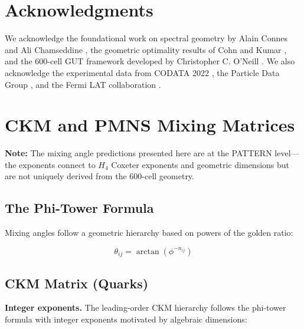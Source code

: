 \documentclass[12pt,a4paper]{article}
\begin{document}
\section*{Acknowledgments}

We acknowledge the foundational work on spectral geometry by Alain Connes and Ali Chamseddine \cite{chamseddine1997}, the geometric optimality results of Cohn and Kumar \cite{cohn2007,cohn2011}, and the 600-cell GUT framework developed by Christopher C. O'Neill \cite{oneill2025gut,oneill2025120cell,oneill2023binary}. We also acknowledge the experimental data from CODATA 2022 \cite{codata2022}, the Particle Data Group \cite{pdg2024}, and the Fermi LAT collaboration \cite{fermi2009}.

\appendix

\section{CKM and PMNS Mixing Matrices}
\label{app:ckm}

\textbf{Note:} The mixing angle predictions presented here are at the PATTERN level---the exponents connect to $H_4$ Coxeter exponents and geometric dimensions but are not uniquely derived from the 600-cell geometry.


\subsection{The Phi-Tower Formula}

Mixing angles follow a geometric hierarchy based on powers of the golden ratio:

\begin{equation}
\boxed{\theta_{ij} = \arctan(\phi^{-n_{ij}})}
\end{equation}

\subsection{CKM Matrix (Quarks)}

\textbf{Integer exponents.} The leading-order CKM hierarchy follows the phi-tower formula with integer exponents motivated by algebraic dimensions:
\end{document}
